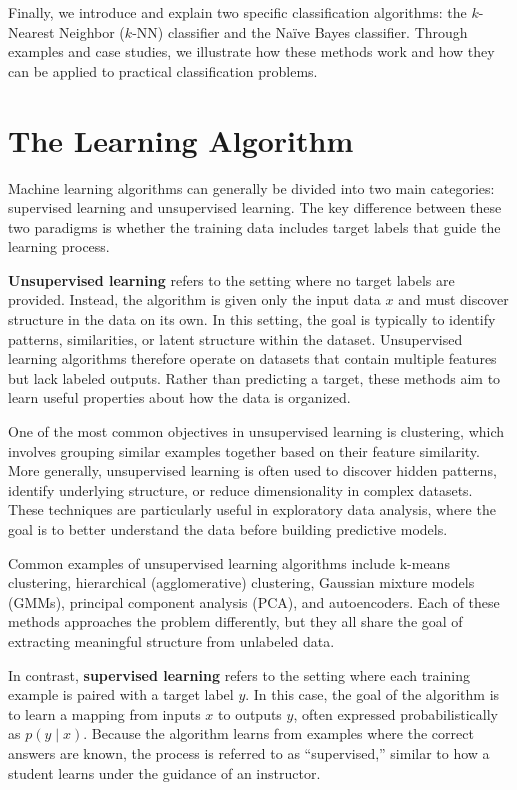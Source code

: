 \documentclass{article}
\begin{document}
Finally, we introduce and explain two specific classification algorithms: the $k$-Nearest Neighbor ($k$-NN) classifier and the Na\"ive Bayes classifier. Through examples and case studies, we illustrate how these methods work and how they can be applied to practical classification problems.

\section{The Learning Algorithm} 

Machine learning algorithms can generally be divided into two main categories: supervised learning and unsupervised learning. The key difference between these two paradigms is whether the training data includes target labels that guide the learning process.

\textbf{Unsupervised learning} refers to the setting where no target labels are provided. Instead, the algorithm is given only the input data \(x\) and must discover structure in the data on its own. In this setting, the goal is typically to identify patterns, similarities, or latent structure within the dataset. Unsupervised learning algorithms therefore operate on datasets that contain multiple features but lack labeled outputs. Rather than predicting a target, these methods aim to learn useful properties about how the data is organized.

One of the most common objectives in unsupervised learning is clustering, which involves grouping similar examples together based on their feature similarity. More generally, unsupervised learning is often used to discover hidden patterns, identify underlying structure, or reduce dimensionality in complex datasets. These techniques are particularly useful in exploratory data analysis, where the goal is to better understand the data before building predictive models.

Common examples of unsupervised learning algorithms include k-means clustering, hierarchical (agglomerative) clustering, Gaussian mixture models (GMMs), principal component analysis (PCA), and autoencoders. Each of these methods approaches the problem differently, but they all share the goal of extracting meaningful structure from unlabeled data.

In contrast, \textbf{supervised learning} refers to the setting where each training example is paired with a target label \(y\). In this case, the goal of the algorithm is to learn a mapping from inputs \(x\) to outputs \(y\), often expressed probabilistically as \(p(y \mid x)\). Because the algorithm learns from examples where the correct answers are known, the process is referred to as ``supervised,'' similar to how a student learns under the guidance of an instructor.
\end{document}
